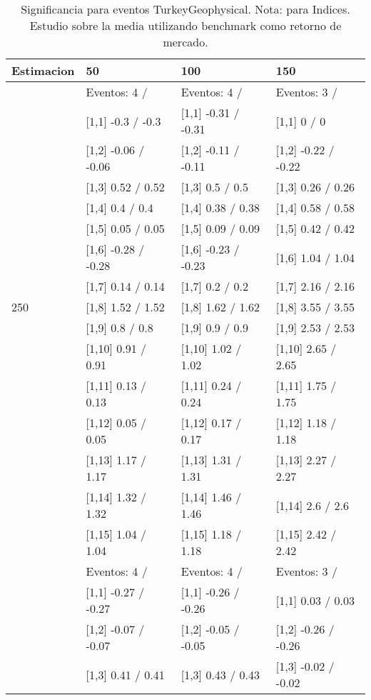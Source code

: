 \begin{table}

\caption{Significancia para eventos TurkeyGeophysical. Nota: para Indices. Estudio sobre la media utilizando benchmark como retorno de mercado.}
\centering
\begin{tabular}[t]{llll}
\toprule
Estimacion & 50 & 100 & 150\\
\midrule
 & Eventos:  4 / & Eventos:  4 / & Eventos:  3 /\\
 & {}[1,1] -0.3  / -0.3 & {}[1,1] -0.31  / -0.31 & {}[1,1] 0  / 0\\
 & {}[1,2] -0.06  / -0.06 & {}[1,2] -0.11  / -0.11 & {}[1,2] -0.22  / -0.22\\
 & {}[1,3] 0.52  / 0.52 & {}[1,3] 0.5  / 0.5 & {}[1,3] 0.26  / 0.26\\
 & {}[1,4] 0.4  / 0.4 & {}[1,4] 0.38  / 0.38 & {}[1,4] 0.58  / 0.58\\
\addlinespace
 & {}[1,5] 0.05  / 0.05 & {}[1,5] 0.09  / 0.09 & {}[1,5] 0.42  / 0.42\\
 & {}[1,6] -0.28  / -0.28 & {}[1,6] -0.23  / -0.23 & {}[1,6] 1.04  / 1.04\\
 & {}[1,7] 0.14  / 0.14 & {}[1,7] 0.2  / 0.2 & {}[1,7] 2.16  / 2.16\\
250 & {}[1,8] 1.52  / 1.52 & {}[1,8] 1.62  / 1.62 & {}[1,8] 3.55  / 3.55\\
 & {}[1,9] 0.8  / 0.8 & {}[1,9] 0.9  / 0.9 & {}[1,9] 2.53  / 2.53\\
\addlinespace
 & {}[1,10] 0.91  / 0.91 & {}[1,10] 1.02  / 1.02 & {}[1,10] 2.65  / 2.65\\
 & {}[1,11] 0.13  / 0.13 & {}[1,11] 0.24  / 0.24 & {}[1,11] 1.75  / 1.75\\
 & {}[1,12] 0.05  / 0.05 & {}[1,12] 0.17  / 0.17 & {}[1,12] 1.18  / 1.18\\
 & {}[1,13] 1.17  / 1.17 & {}[1,13] 1.31  / 1.31 & {}[1,13] 2.27  / 2.27\\
 & {}[1,14] 1.32  / 1.32 & {}[1,14] 1.46  / 1.46 & {}[1,14] 2.6  / 2.6\\
\addlinespace
 & {}[1,15] 1.04  / 1.04 & {}[1,15] 1.18  / 1.18 & {}[1,15] 2.42  / 2.42\\
 & Eventos:  4 / & Eventos:  4 / & Eventos:  3 /\\
 & {}[1,1] -0.27  / -0.27 & {}[1,1] -0.26  / -0.26 & {}[1,1] 0.03  / 0.03\\
 & {}[1,2] -0.07  / -0.07 & {}[1,2] -0.05  / -0.05 & {}[1,2] -0.26  / -0.26\\
 & {}[1,3] 0.41  / 0.41 & {}[1,3] 0.43  / 0.43 & {}[1,3] -0.02  / -0.02\\

\end{tabular}
\end{table}
